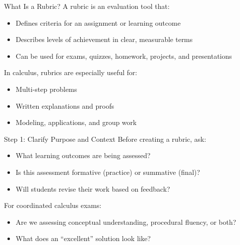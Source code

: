 \documentclass{beamer}
\begin{document}
\begin{frame}{What Is a Rubric?}
A rubric is an evaluation tool that:
\begin{itemize}
    \item Defines criteria for an assignment or learning outcome
    \item Describes levels of achievement in clear, measurable terms
    \item Can be used for exams, quizzes, homework, projects, and presentations
\end{itemize}

\vspace{0.3cm}
In calculus, rubrics are especially useful for:
\begin{itemize}
    \item Multi-step problems
    \item Written explanations and proofs
    \item Modeling, applications, and group work
\end{itemize}
\end{frame}

\begin{frame}{Step 1: Clarify Purpose and Context}
Before creating a rubric, ask:
\begin{itemize}
    \item What learning outcomes are being assessed?
    \item Is this assessment formative (practice) or summative (final)?
    \item Will students revise their work based on feedback?
\end{itemize}

\vspace{0.3cm}
For coordinated calculus exams:
\begin{itemize}
    \item Are we assessing conceptual understanding, procedural fluency, or both?
    \item What does an ``excellent'' solution look like?
\end{itemize}
\end{frame}
\end{document}
